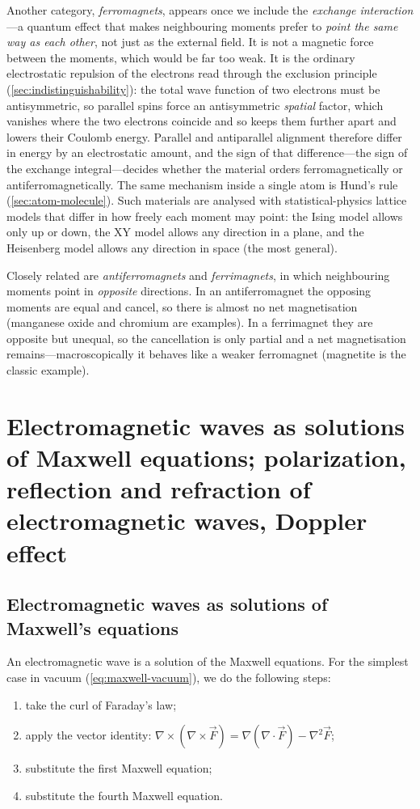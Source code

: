         Another category, \emph{ferromagnets}, appears once we include the \emph{exchange interaction}---a quantum effect that makes neighbouring moments prefer to \emph{point the same way as each other}, not just as the external field. It is not a magnetic force between the moments, which would be far too weak. It is the ordinary electrostatic repulsion of the electrons read through the exclusion principle (\cref{sec:indistinguishability}): the total wave function of two electrons must be antisymmetric, so parallel spins force an antisymmetric \emph{spatial} factor, which vanishes where the two electrons coincide and so keeps them further apart and lowers their Coulomb energy. Parallel and antiparallel alignment therefore differ in energy by an electrostatic amount, and the sign of that difference---the sign of the exchange integral---decides whether the material orders ferromagnetically or antiferromagnetically. The same mechanism inside a single atom is Hund's rule (\cref{sec:atom-molecule}).
        Such materials are analysed with statistical-physics lattice models that differ in how freely each moment may point: the Ising model allows only up or down, the XY model allows any direction in a plane, and the Heisenberg model allows any direction in space (the most general).

        Closely related are \emph{antiferromagnets} and \emph{ferrimagnets}, in which neighbouring moments point in \emph{opposite} directions. In an antiferromagnet the opposing moments are equal and cancel, so there is almost no net magnetisation (manganese oxide and chromium are examples). In a ferrimagnet they are opposite but unequal, so the cancellation is only partial and a net magnetisation remains---macroscopically it behaves like a weaker ferromagnet (magnetite is the classic example).

\section{Electromagnetic waves as solutions of Maxwell equations; polarization, reflection and refraction of electromagnetic waves, Doppler effect}
\label{sec:em-waves}

    \subsection{Electromagnetic waves as solutions of Maxwell's equations}

        An electromagnetic wave is a solution of the Maxwell equations. For the simplest case in vacuum (\cref{eq:maxwell-vacuum}), we do the following steps:
        \begin{enumerate}
            \item take the curl of Faraday's law;
            \item apply the vector identity: $\nabla\times(\nabla\times\vec{F}) = \nabla(\nabla\cdot\vec{F}) - \nabla^{2}\vec{F}$;
            \item substitute the first Maxwell equation;
            \item substitute the fourth Maxwell equation.
        \end{enumerate}

